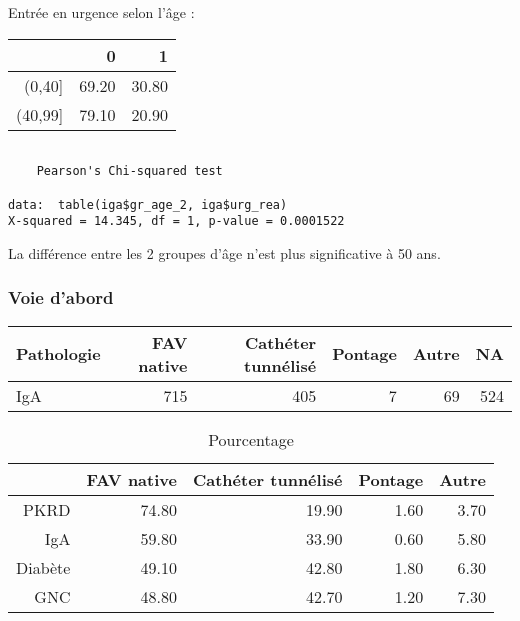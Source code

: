 \documentclass[11pt,a4paper]{article}\usepackage[]{graphicx}\usepackage[]{color}
\makeatletter
\newenvironment{kframe}{%
 \def\at@end@of@kframe{}%
 \ifinner\ifhmode%
  \def\at@end@of@kframe{\end{minipage}}%
  \begin{minipage}{\columnwidth}%
 \fi\fi%
 \def\FrameCommand##1{\hskip\@totalleftmargin \hskip-\fboxsep
 \colorbox{shadecolor}{##1}\hskip-\fboxsep
     \hskip-\linewidth \hskip-\@totalleftmargin \hskip\columnwidth}%
 \MakeFramed {\advance\hsize-\width
   \@totalleftmargin\z@ \linewidth\hsize
   \@setminipage}}%
 {\par\unskip\endMakeFramed%
 \at@end@of@kframe}
\newenvironment{knitrout}{}{} %
\makeatother
\begin{document}
Entrée en urgence selon l'âge :

\begin{table}[H]
\centering
\begin{tabular}{rrr}
  \hline
 & 0 & 1 \\ 
  \hline
(0,40] & 69.20 & 30.80 \\ 
  (40,99] & 79.10 & 20.90 \\ 
   \hline
\end{tabular}
\end{table}


\begin{knitrout}
\color{fgcolor}\begin{kframe}
\begin{verbatim}

	Pearson's Chi-squared test

data:  table(iga$gr_age_2, iga$urg_rea)
X-squared = 14.345, df = 1, p-value = 0.0001522
\end{verbatim}
\end{kframe}
\end{knitrout}

La différence entre les 2 groupes d'âge n'est plus significative à 50 ans.

  \subsubsection*{Voie d’abord}

\begin{table}[ht]
\centering
\begin{tabular}{lrrrrr}
  \hline
Pathologie & FAV native & Cathéter tunnélisé & Pontage & Autre & NA \\ 
  \hline
IgA & 715 & 405 &   7 &  69 & 524 \\ 
   \hline
\end{tabular}
\end{table}
\begin{table}[ht]
\centering
\begin{tabular}{rrrrr}
  \hline
 & FAV native & Cathéter tunnélisé & Pontage & Autre \\ 
  \hline
PKRD & 74.80 & 19.90 & 1.60 & 3.70 \\ 
  IgA & 59.80 & 33.90 & 0.60 & 5.80 \\ 
  Diabète & 49.10 & 42.80 & 1.80 & 6.30 \\ 
  GNC & 48.80 & 42.70 & 1.20 & 7.30 \\ 
   \hline
\end{tabular}
\caption{Pourcentage} 
\end{table}
\end{document}
